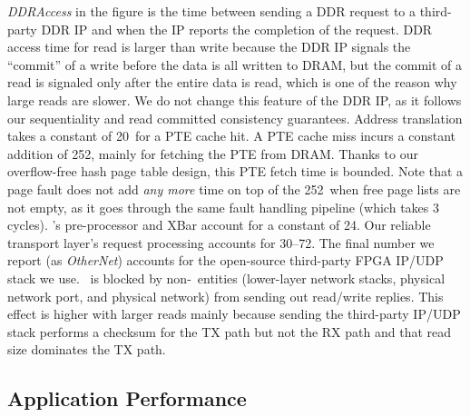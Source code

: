 
{\em DDRAccess} in the figure is the time between sending a DDR request to a third-party DDR IP 
and when the IP reports the completion of the request.
DDR access time for read is larger than write because the DDR IP signals the ``commit'' of a write before the data is all written to DRAM,
but the commit of a read is signaled only after the entire data is read, which is one of the reason why large reads are slower.
We do not change this feature of the DDR IP, as it follows our sequentiality and read committed consistency guarantees.
Address translation takes a constant of 20\ns\ for a PTE cache hit.
A PTE cache miss incurs a constant addition of 252\ns, mainly for fetching the PTE from DRAM.
Thanks to our overflow-free hash page table design, this PTE fetch time is bounded.
Note that a page fault does not add {\em any more} time on top of the 252\ns\ when free page lists are not empty,
as it goes through the same fault handling pipeline (which takes 3 cycles).
\sys's pre-processor and XBar account for a constant of 24\ns.
Our reliable transport layer's request processing accounts for 30--72\ns.
The final number we report (as {\em OtherNet}) accounts for the open-source third-party FPGA IP/UDP stack we use. 
\sys\ is blocked by non-\sys\ entities (lower-layer network stacks, physical network port, and physical network) from sending out read/write replies.
This effect is higher with larger reads mainly because sending the third-party IP/UDP stack performs a checksum for the TX path but not the RX path
and that read size dominates the TX path.
\fi



\subsection{Application Performance}

